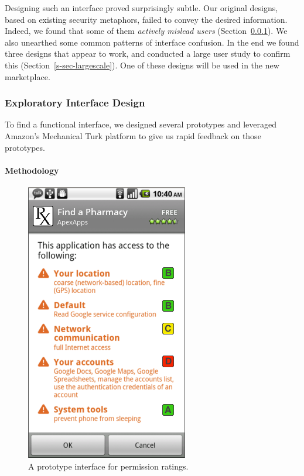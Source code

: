 \documentclass[11pt]{article}
\newcommand{\refsec}[1]{Section~\ref{#1}}
\begin{document}
Designing such an interface proved surprisingly subtle. 
Our original designs, based on existing security 
metaphors, failed to convey the desired information.
Indeed, we found that some of them \emph{actively 
mislead users} (\refsec{sec-ui-design}).
We also unearthed some common patterns of interface
confusion. In the end we found three designs that appear to work, and
conducted a large user study to confirm this
(\refsec{s-sec-largescale}). One of these designs will be used in the new
marketplace.

\subsubsection{Exploratory Interface Design}
\label{sec-ui-design}

To find a functional interface, we designed several prototypes and 
leveraged Amazon's Mechanical Turk platform to give us rapid feedback 
on those prototypes.

\paragraph{Methodology}
\label{subsec-small-methods}

\begin{figure}
    \begin{center}
        \includegraphics[width=.8\linewidth]{img/GradesPerms.png}
    \end{center}
    \caption{A prototype interface for permission ratings.}
    \label{grade-perms}
\end{figure}
\end{document}
